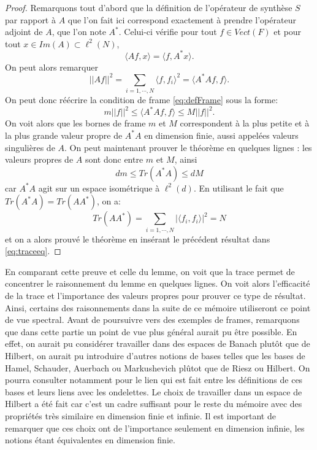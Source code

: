 	\begin{proof}
		Remarquons tout d'abord que la définition de l'opérateur de synthèse $S$ par rapport à $A$ que l'on fait ici correspond exactement à prendre l'opérateur adjoint de $A$, que l'on note $A^*$.
		Celui-ci vérifie pour tout $f\in Vect(F)$ et pour tout $x\in Im(A) \subset \ell^2(N)$,
		\begin{equation}
			\langle Af, x \rangle = \langle f, A^*x \rangle.
		\end{equation}
		On peut alors remarquer
		\begin{equation}
			||Af||^2 = \sum_{i=1, \cdots,N} \langle f, f_i \rangle^2 = \langle A^*Af, f\rangle.
		\end{equation}
		On peut donc réécrire la condition de frame \ref{eq:defFrame} sous la forme:
		\begin{equation}
			m||f||^2 \leq \langle A^*Af, f\rangle \leq M||f||^2.
		\end{equation}
		On voit alors que les bornes de frame $m$ et $M$ correspondent à la plus petite et à la plus grande valeur propre de $A^*A$ en dimension finie, aussi appelées valeurs singulières de $A$.
		\newline
		On peut maintenant prouver le théorème en quelques lignes : les valeurs propres de $A$ sont donc entre $m$ et $M$, ainsi
		\begin{equation}\label{eq:traceeq}
			dm \leq Tr(A^*A) \leq dM
		\end{equation}
		car $A^*A$ agit sur un espace isométrique à $\ell^2(d)$.
		En utilisant le fait que $Tr(A^*A) = Tr(AA^*)$, on a:
		\begin{equation}
			Tr(AA^*) = \sum_{i=1,\cdots, N} |\langle f_i, f_i \rangle|^2 = N
		\end{equation}
		et on a alors prouvé le théorème en insérant le précédent résultat dans \ref{eq:traceeq}.  	
	\end{proof}	
	En comparant cette preuve et celle du lemme, on voit que la trace permet de concentrer le raisonnement du lemme en quelques lignes.
	On voit alors l'efficacité de la trace et l'importance des valeurs propres pour prouver ce type de résultat.
	Ainsi, certains des raisonnements dans la suite de ce mémoire utiliseront ce point de vue spectral.
	\newline
	Avant de poursuivre vers des exemples de frames, remarquons que dans cette partie un point de vue plus général aurait pu être possible.
	En effet, on aurait pu considérer travailler dans des espaces de Banach plutôt que de Hilbert, on aurait pu introduire d'autres notions de bases telles que les bases de Hamel, Schauder, Auerbach ou Markushevich plûtot que de Riesz ou Hilbert.
	On pourra consulter \cite{jaffardondelettes} notamment pour le lien qui est fait entre les définitions de ces bases et leurs liens avec les ondelettes.
	Le choix de travailler dans un espace de Hilbert a été fait car c'est un cadre suffisant pour le reste du mémoire avec des propriétés très similaire en dimension finie et infinie.
	Il est important de remarquer que ces choix ont de l'importance seulement en dimension infinie, les notions étant équivalentes en dimension finie.

